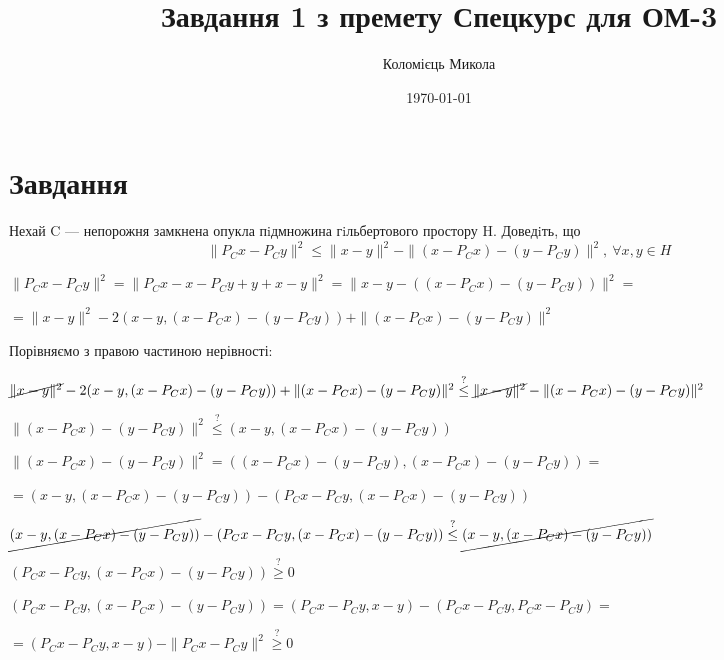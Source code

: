 \documentclass[a4paper]{extreport}
\title{Завдання 1 з премету Спецкурс для ОМ-3}
\author{Коломієць Микола}
\date{\today}
\begin{document}
    \maketitle

    \tableofcontents

    \pagebreak

    \chapter{Завдання \theHchapter}

    \begin{tcolorbox}[title=Завдання]
        Нехай C — непорожня замкнена опукла пiдмножина гiльбертового простору H. Доведiть, що
        $$ \| P_Cx - P_Cy  \|^ 2 \le
        \| x - y \| ^ 2 - 
        \| (x - P_Cx) - (y - P_Cy) \| ^ 2, \ \forall x, y \in H $$
    \end{tcolorbox}



    $ \| P_Cx - P_Cy  \|^ 2 = \| P_Cx - x - P_Cy + y + x - y  \|^ 2 = 
    \| x - y - ((x - P_Cx) - (y - P_Cy))  \|^ 2 = $


    $= \| x - y \| ^ 2 - 2 ( x - y,(x - P_Cx) - (y - P_Cy) ) + 
    \| (x - P_Cx) - (y - P_Cy) \| ^ 2 $


    Порівняємо з правою частиною нерівності:
    
    
    $ \cancel{\| x - y \| ^ 2} - 2 ( x - y,(x - P_Cx) - (y - P_Cy) ) + 
    \| (x - P_Cx) - (y - P_Cy) \| ^ 2 \stackrel{?}{\le} 
    \cancel{\|x - y\|^2} - \| (x - P_Cx) - (y - P_Cy) \| ^ 2 $



    $\|(x - P_Cx) - (y - P_Cy) \| ^ 2 \stackrel{?}{\le} 
    (x - y,(x - P_Cx) - (y - P_Cy))$


    $ \|(x - P_Cx) - (y - P_Cy) \| ^ 2 = 
    ((x - P_Cx) - (y - P_Cy), (x - P_Cx) - (y - P_Cy)) =$
    

    $= (x - y, (x - P_Cx) - (y - P_Cy)) - (P_Cx - P_Cy, (x - P_Cx) - (y - P_Cy)) $


    $ \cancel{(x - y, (x - P_Cx) - (y - P_Cy))} - (P_Cx - P_Cy, (x - P_Cx) - (y - P_Cy)) 
    \stackrel{?}{\le} \cancel{(x - y,(x - P_Cx) - (y - P_Cy))} $


    $(P_Cx - P_Cy, (x - P_Cx) - (y - P_Cy)) \stackrel{?}{\geq} 0 $


    $(P_Cx - P_Cy, (x - P_Cx) - (y - P_Cy)) = 
    (P_Cx - P_Cy, x - y) - (P_Cx - P_Cy,  P_Cx - P_Cy) = $


    $=(P_Cx - P_Cy, x - y) - \|P_Cx - P_Cy \|^2 \stackrel{?}{\geq} 0 $
\end{document}

